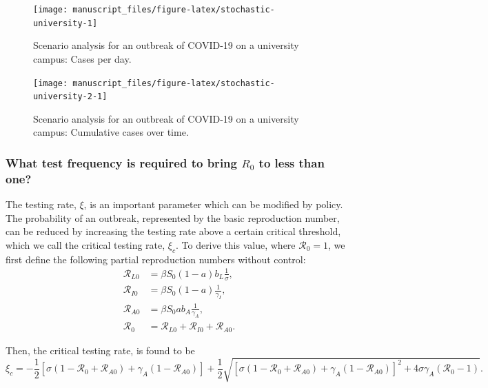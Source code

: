 \documentclass[
]{article}
\begin{document}
\begin{figure}

{\centering \texttt{[image: manuscript\_files/figure-latex/stochastic-university-1]} 

}

\caption{\label{fig:scenario-university}Scenario analysis for an outbreak of COVID-19 on a university campus: Cases per day.}\label{fig:stochastic-university}
\end{figure}

\begin{figure}

{\centering \texttt{[image: manuscript\_files/figure-latex/stochastic-university-2-1]} 

}

\caption{\label{fig:scenario-university-2}Scenario analysis for an outbreak of COVID-19 on a university campus: Cumulative cases over time.}\label{fig:stochastic-university-2}
\end{figure}

\hypertarget{what-test-frequency-is-required-to-bring-r_0-to-less-than-one}{%
\subsubsection{\texorpdfstring{What test frequency is required to bring
\(R_0\) to less than
one?}{What test frequency is required to bring R\_0 to less than one?}}\label{what-test-frequency-is-required-to-bring-r_0-to-less-than-one}}

The testing rate, \(\xi\), is an important parameter which can be
modified by policy. The probability of an outbreak, represented by the
basic reproduction number, can be reduced by increasing the testing rate
above a certain critical threshold, which we call the critical testing
rate, \(\xi_c\). To derive this value, where \(\mathcal{R}_{0}=1\), we
first define the following partial reproduction numbers without control:
\begin{align*}
\mathcal{R}_{L0} & =\beta S_{0}\left(1-a\right)b_{L}\frac{1}{\sigma},\\
\mathcal{R}_{I0} & =\beta S_{0}\left(1-a\right)\frac{1}{\gamma_{I}},\\
\mathcal{R}_{A0} & =\beta S_{0}ab_{A}\frac{1}{\gamma_{A}},\\
\mathcal{R}_{0} & =\mathcal{R}_{L0}+\mathcal{R}_{I0}+\mathcal{R}_{A0}.
\end{align*}

Then, the critical testing rate, is found to be \[
\xi_{c}=-\frac{1}{2}\left[\sigma\left(1-\mathcal{R}_{0}+\mathcal{R}_{A0}\right)+\gamma_{A}\left(1-\mathcal{R}_{A0}\right)\right]+\frac{1}{2}\sqrt{\left[\sigma\left(1-\mathcal{R}_{0}+\mathcal{R}_{A0}\right)+\gamma_{A}\left(1-\mathcal{R}_{A0}\right)\right]^{2}+4\sigma\gamma_{A}\left(\mathcal{R}_{0}-1\right)}.
\]
\end{document}
